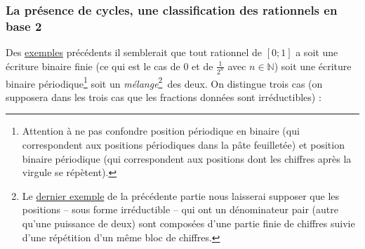 \documentclass[a4paper,french,12pt]{article}
\begin{document}
\subsubsection{La présence de cycles, une classification des rationnels en base 2}
Des \hyperlink{9}{exemples} précédents il semblerait que tout rationnel de $\left[0;1\right]$ a soit une écriture binaire finie (ce qui est le cas de $0$ et de $\frac{1}{2^n}$ avec $n\in\mathbb{N}$) soit une écriture binaire périodique\footnote{Attention à ne pas confondre position périodique en binaire (qui correspondent aux positions périodiques dans la pâte feuilletée) et position binaire périodique (qui correspondent aux positions dont les chiffres après la virgule se répètent).} soit un \emph{mélange}\footnote{Le \hyperlink{13}{dernier exemple} de la précédente partie nous laisserai supposer que les positions -- sous forme irréductible -- qui ont un dénominateur pair (autre qu'une puissance de deux) sont composées d'une partie finie de chiffres suivie d'une répétition d'un même bloc de chiffres.} des deux. On distingue trois cas (on supposera dans les trois cas que les fractions données sont irréductibles) :
\end{document}
